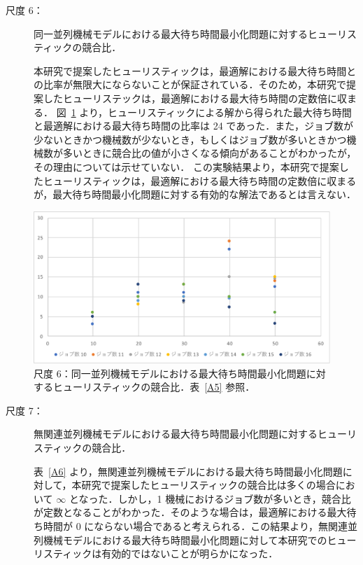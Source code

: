 \documentclass[12pt]{optlab-bachelor}
\begin{document}
\begin{description}
  \item[尺度 6：] 同一並列機械モデルにおける最大待ち時間最小化問題に対するヒューリスティックの競合比．

  本研究で提案したヒューリスティックは，最適解における最大待ち時間との比率が無限大にならないことが保証されている．そのため，本研究で提案したヒューリステックは，最適解における最大待ち時間の定数倍に収まる．
  図~\ref{5.6} より，ヒューリスティックによる解から得られた最大待ち時間と最適解における最大待ち時間の比率は 24 であった．また，ジョブ数が少ないときかつ機械数が少ないとき，もしくはジョブ数が多いときかつ機械数が多いときに競合比の値が小さくなる傾向があることがわかったが，その理由については示せていない．
  この実験結果より，本研究で提案したヒューリスティックは，最適解における最大待ち時間の定数倍に収まるが，最大待ち時間最小化問題に対する有効的な解法であるとは言えない．
\end{description}
\begin{figure}[ht]
  \centering
  \includegraphics[width = 13cm]{figure/compId1.pdf}
  \caption{尺度 6：同一並列機械モデルにおける最大待ち時間最小化問題に対するヒューリスティックの競合比．表~\ref{A5} 参照．}
  \label{5.6}
\end{figure}

\begin{description}
  \item[尺度 7：] 無関連並列機械モデルにおける最大待ち時間最小化問題に対するヒューリスティックの競合比．

  表~\ref{A6} より，無関連並列機械モデルにおける最大待ち時間最小化問題に対して，本研究で提案したヒューリスティックの競合比は多くの場合において $\infty$ となった．しかし，1 機械におけるジョブ数が多いとき，競合比が定数となることがわかった．そのような場合は，最適解における最大待ち時間が 0 にならない場合であると考えられる．この結果より，無関連並列機械モデルにおける最大待ち時間最小化問題に対して本研究でのヒューリスティックは有効的ではないことが明らかになった．
\end{description}
\end{document}
